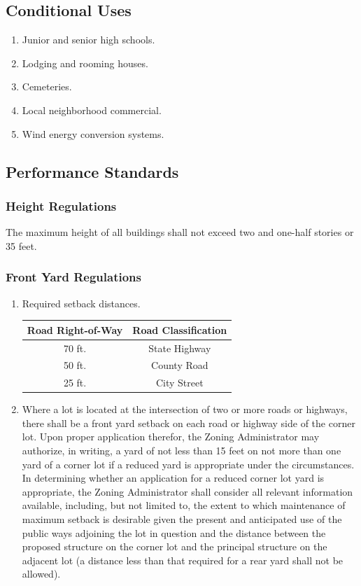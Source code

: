 \subsection{Conditional Uses}
\begin{enumerate}[{\indent}1)]
    \item Junior and senior high schools.
    \item Lodging and rooming houses.
    \item Cemeteries.  
    \item Local neighborhood commercial.  
    \item Wind energy conversion systems.
\end{enumerate}
\subsection{Performance Standards}
\subsubsection{Height Regulations}
The maximum height of all buildings shall not exceed two and one-half stories or 35 feet.
\subsubsection{Front Yard Regulations}
\begin{enumerate}[{\indent}a)]
    \item Required setback distances.        
        \begin{center}
        \begin{tabular}{|c|c|}
            \hline
            \textbf{Road Right-of-Way} & \textbf{Road Classification}\\
            \hline
            70 ft. & State Highway\\
            \hline
            50 ft. & County Road\\
            \hline
            25 ft. & City Street\\
            \hline
        \end{tabular}
        \end{center}
    \item Where a lot is located at the intersection of two or more roads or highways, there shall be a front yard setback on each road or highway side of the corner lot. Upon proper application therefor, the Zoning Administrator may authorize, in writing, a yard of not less than 15 feet on not more than one yard of a corner lot if a reduced yard is appropriate under the circumstances. In determining whether an application for a reduced corner lot yard is appropriate, the Zoning Administrator shall consider all relevant information available, including, but not limited to, the extent to which maintenance of maximum setback is desirable given the present and anticipated use of the public ways adjoining the lot in question and the distance between the proposed structure on the corner lot and the principal structure on the adjacent lot (a distance less than that required for a rear yard shall not be allowed).
\end{enumerate}
